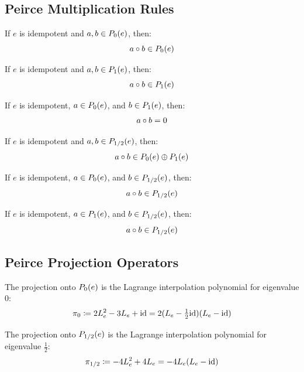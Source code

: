 \subsection{Peirce Multiplication Rules}

\begin{theorem}
If $e$ is idempotent and $a, b \in \Peirce{e}{0}$, then:
\[ a \jmul b \in \Peirce{e}{0} \]
\end{theorem}

\begin{theorem}
If $e$ is idempotent and $a, b \in \Peirce{e}{1}$, then:
\[ a \jmul b \in \Peirce{e}{1} \]
\end{theorem}

\begin{theorem}
If $e$ is idempotent, $a \in \Peirce{e}{0}$, and $b \in \Peirce{e}{1}$, then:
\[ a \jmul b = 0 \]
\end{theorem}

\begin{theorem}
If $e$ is idempotent and $a, b \in \Peirce{e}{1/2}$, then:
\[ a \jmul b \in \Peirce{e}{0} \oplus \Peirce{e}{1} \]
\end{theorem}

\begin{theorem}
If $e$ is idempotent, $a \in \Peirce{e}{0}$, and $b \in \Peirce{e}{1/2}$, then:
\[ a \jmul b \in \Peirce{e}{1/2} \]
\end{theorem}

\begin{theorem}
If $e$ is idempotent, $a \in \Peirce{e}{1}$, and $b \in \Peirce{e}{1/2}$, then:
\[ a \jmul b \in \Peirce{e}{1/2} \]
\end{theorem}

\subsection{Peirce Projection Operators}

\begin{definition}[peirceProj$_0$]
The projection onto $\Peirce{e}{0}$ is the Lagrange interpolation polynomial for eigenvalue $0$:
\[ \pi_0 \defas 2\Lop{e}^2 - 3\Lop{e} + \mathrm{id} = 2(\Lop{e} - \tfrac{1}{2}\mathrm{id})(\Lop{e} - \mathrm{id}) \]
\end{definition}

\begin{definition}[peirceProj$_{1/2}$]
The projection onto $\Peirce{e}{1/2}$ is the Lagrange interpolation polynomial for eigenvalue $\frac{1}{2}$:
\[ \pi_{1/2} \defas -4\Lop{e}^2 + 4\Lop{e} = -4\Lop{e}(\Lop{e} - \mathrm{id}) \]
\end{definition}

